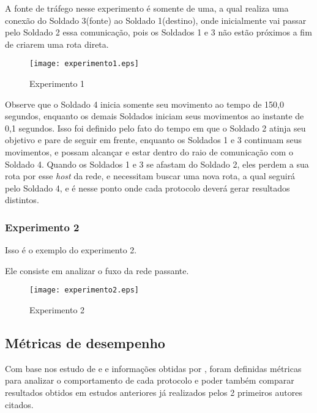 A fonte de tr\'afego nesse experimento \'e somente de uma, a qual realiza uma conex\~ao do Soldado 3(fonte) ao Soldado 1(destino), onde inicialmente vai passar pelo Soldado 2 essa comunica\c{c}\~ao, pois os Soldados 1 e 3 n\~ao est\~ao pr\'oximos a fim de criarem uma rota direta.

\begin{figure}[H]
	\centering
	\texttt{[image: experimento1.eps]}
	\caption{Experimento 1}
	\label{figExp1}
\end{figure}

Observe que o Soldado 4 inicia somente seu movimento ao tempo de 150,0 segundos, enquanto os demais Soldados iniciam seus movimentos ao instante de 0,1 segundos.
Isso foi definido pelo fato do tempo em que o Soldado 2 atinja seu objetivo e pare de seguir em frente, enquanto os Soldados 1 e 3 continuam seus movimentos, e possam alcan\c{c}ar e estar dentro do raio de comunica\c{c}\~ao com o Soldado 4.
Quando os Soldados 1 e 3 se afastam do Soldado 2, eles perdem a sua rota por esse \textit{host} da rede, e necessitam buscar uma nova rota, a qual seguir\'a pelo Soldado 4, e \'e nesse ponto onde cada protocolo dever\'a gerar resultados distintos.

\subsubsection{Experimento 2}
Isso \'e o exemplo do experimento 2.

Ele consiste em analizar o fuxo da rede passante.

\begin{figure}[H]
	\centering
	\texttt{[image: experimento2.eps]}
	\caption{Experimento 2}
	\label{figExp2}
\end{figure}


\subsection{M\'etricas de desempenho}
Com base nos estudo de \cite{pereira} e \cite{schimidt} e informa\c{c}\~oes obtidas por \cite{salles}, foram definidas m\'etricas para analizar o comportamento de cada protocolo e poder tamb\'em comparar resultados obtidos em estudos anteriores j\'a realizados pelos 2 primeiros autores citados.

